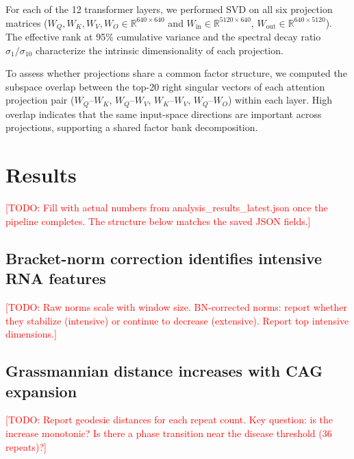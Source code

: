 \documentclass[11pt]{article}
\newcommand{\R}{\mathbb{R}}
\newcommand{\TODO}[1]{\textcolor{red}{[TODO: #1]}}
\begin{document}
For each of the 12 transformer layers, we performed SVD on all six
projection matrices ($W_Q, W_K, W_V, W_O \in \R^{640 \times 640}$
and $W_{\mathrm{in}} \in \R^{5120 \times 640}$,
$W_{\mathrm{out}} \in \R^{640 \times 5120}$).
%
The effective rank at 95\% cumulative variance and the spectral decay
ratio $\sigma_1 / \sigma_{10}$ characterize the intrinsic
dimensionality of each projection.

To assess whether projections share a common factor structure, we
computed the subspace overlap between the top-20 right singular vectors
of each attention projection pair ($W_Q$--$W_K$, $W_Q$--$W_V$,
$W_K$--$W_V$, $W_Q$--$W_O$) within each layer. High overlap indicates
that the same input-space directions are important across projections,
supporting a shared factor bank decomposition.


\section{Results}
\label{sec:results}

\TODO{Fill with actual numbers from analysis\_results\_latest.json once
the pipeline completes. The structure below matches the saved JSON fields.}

\subsection{Bracket-norm correction identifies intensive RNA features}

\TODO{Raw norms scale with window size. BN-corrected norms:
report whether they stabilize (intensive) or continue to decrease (extensive).
Report top intensive dimensions.}


\subsection{Grassmannian distance increases with CAG expansion}

\TODO{Report geodesic distances for each repeat count. Key question:
is the increase monotonic? Is there a phase transition near the
disease threshold (36 repeats)?}
\end{document}
